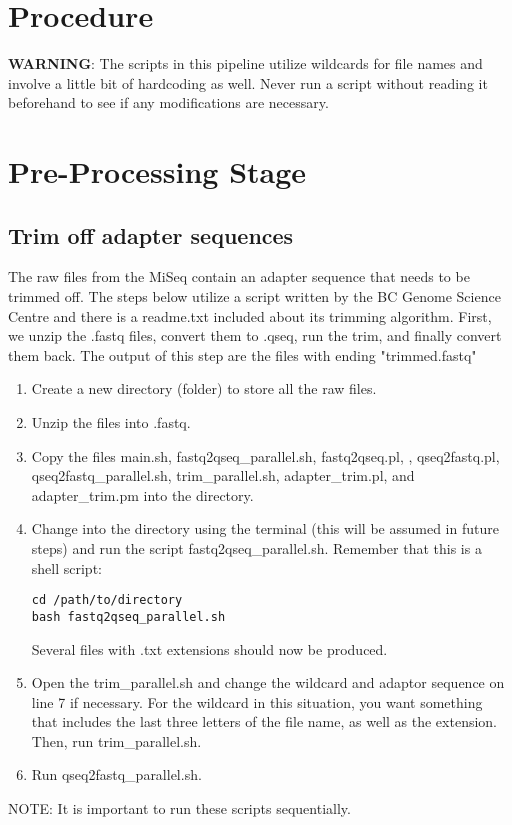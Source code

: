 \documentclass[12pt,titlepage]{article}
\begin{document}
\section*{Procedure}
\textbf{WARNING}: The scripts in this pipeline utilize wildcards for file names and involve a little bit of hardcoding as well. Never run a script without reading it beforehand to see if any modifications are necessary.  

\section{Pre-Processing Stage}

\subsection{Trim off adapter sequences}
The raw files from the MiSeq contain an adapter sequence that needs to be trimmed off. The steps below utilize a script written by the BC Genome Science Centre and there is a readme.txt included about its trimming algorithm. First, we unzip the .fastq files, convert them to .qseq, run the trim, and finally convert them back. The output of this step are the files with ending "trimmed.fastq"
\begin{enumerate}
\item Create a new directory (folder) to store all the raw files.
\item Unzip the files into .fastq.
\item Copy the files main.sh, fastq2qseq\_parallel.sh, fastq2qseq.pl, , qseq2fastq.pl, qseq2fastq\_parallel.sh, trim\_parallel.sh, adapter\_trim.pl, and adapter\_trim.pm  into the directory.
\item Change into the directory using the terminal (this will be assumed in future steps) and run the script fastq2qseq\_parallel.sh. Remember that this is a shell script:
\begin{tcolorbox}
\begin{lstlisting}
cd /path/to/directory
bash fastq2qseq_parallel.sh 
\end{lstlisting}
\end{tcolorbox}
Several files with .txt extensions should now be produced.
\item Open the trim\_parallel.sh and change the wildcard and adaptor sequence on line 7 if necessary. For the wildcard in this situation, you want something that includes the last three letters of the file name, as well as the extension. Then, run trim\_parallel.sh.
\item Run qseq2fastq\_parallel.sh.
\end{enumerate}
\noindent NOTE: It is important to run these scripts sequentially.
\end{document}
